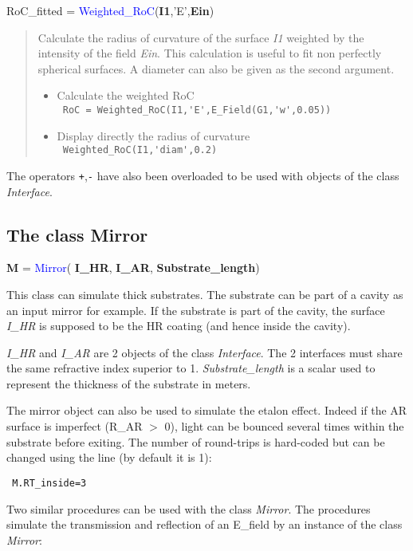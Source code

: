 \noindent RoC\_fitted = \textcolor{blue}{Weighted\_RoC}(\textbf{I1},'E',\textbf{Ein})
\vspace*{-0.2cm}
\begin{quote}
Calculate the radius of curvature of the surface \textsl{I1} weighted by the intensity of the field \textsl{Ein}. This calculation is useful to fit non perfectly spherical surfaces. A diameter can also be given as the second argument.
\begin{itemize}
  \item Calculate the weighted RoC \\
        \verb? RoC = Weighted_RoC(I1,'E',E_Field(G1,'w',0.05)) ?
  \item Display directly the radius of curvature \\
        \verb? Weighted_RoC(I1,'diam',0.2) ?
\end{itemize}
\end{quote}

The operators \verb?+?,\verb?-? have also been overloaded to be used with objects of the class \textit{Interface}.

\subsection{The class Mirror}
\textbf{M} = \textcolor{blue}{Mirror}( \textbf{I\_HR}, \textbf{I\_AR}, \textbf{Substrate\_length})

This class can simulate thick substrates. The substrate can be part of a cavity as an input mirror for example. If the substrate is part of the cavity, the surface \textsl{I\_HR} is supposed to be the HR coating (and hence inside the cavity).

\textsl{I\_HR} and \textsl{I\_AR} are 2 objects of the class \textsl{Interface}. The 2 interfaces must share the same refractive index superior to 1. \textsl{Substrate\_length} is a scalar used to represent the thickness of the substrate in meters.

The mirror object can also be used to simulate the etalon effect. Indeed if the AR surface is imperfect (R\_AR $>$ 0), light can be bounced several times within the substrate before exiting. The number of round-trips is hard-coded but can be changed using the line (by default it is 1):

 \verb? M.RT_inside=3 ?

Two similar procedures can be used with the class \textsl{Mirror}. The procedures simulate the transmission and reflection of an E\_field by an instance of the class \textsl{Mirror}:

